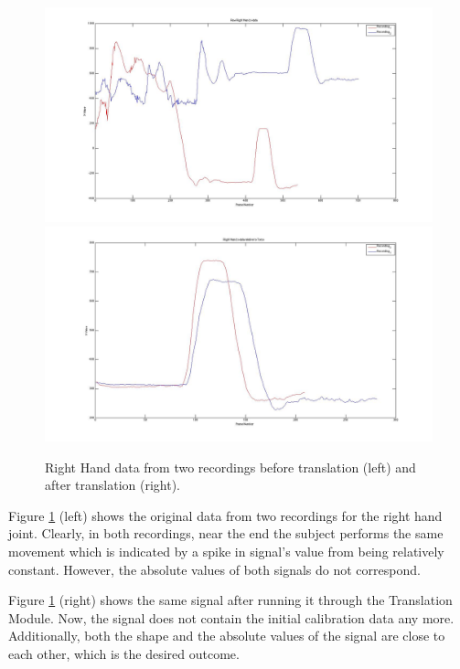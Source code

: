 \documentclass[10pt,a4paper]{article}
\begin{document}
\begin{figure}[H]
\centering
\includegraphics[scale=0.16]{Non_Translated_R_H_Data.jpg}
\includegraphics[scale=0.16]{R_H_Data_Relative_Torso.jpg}

\caption{Right Hand data from two recordings before translation (left) and after translation (right).}
\label{pre_translation_graph}
\end{figure}

\noindent
Figure \ref{pre_translation_graph} (left) shows the original data from two recordings for the right hand joint. Clearly, in both recordings, near the end the subject performs the same movement which is indicated by a spike in signal's value from being relatively constant. However, the absolute values of both signals do not correspond.
 
\noindent
Figure \ref{pre_translation_graph} (right) shows the same signal after running it through the Translation Module. Now, the signal does not contain the initial calibration data any more. Additionally, both the shape and the absolute values of the signal are close to each other, which is the desired outcome.
\end{document}
